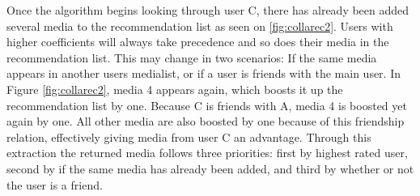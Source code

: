 Once the algorithm begins looking through user C, there has already been added several media to the recommendation list as seen on \ref{fig:collarec2}. Users with higher coefficients will always take precedence and so does their media in the recommendation list. This may change in two scenarios: If the same media appears in another users medialist, or if a user is friends with the main user. In Figure \ref{fig:collarec2}, media 4 appears again, which boosts it up the recommendation list by one. Because C is friends with A, media 4 is boosted yet again by one. All other media are also boosted by one because of this friendship relation, effectively giving media from user C an advantage. Through this extraction the returned media follows three priorities: first by highest rated user, second by if the same media has already been added, and third by whether or not the user is a friend.